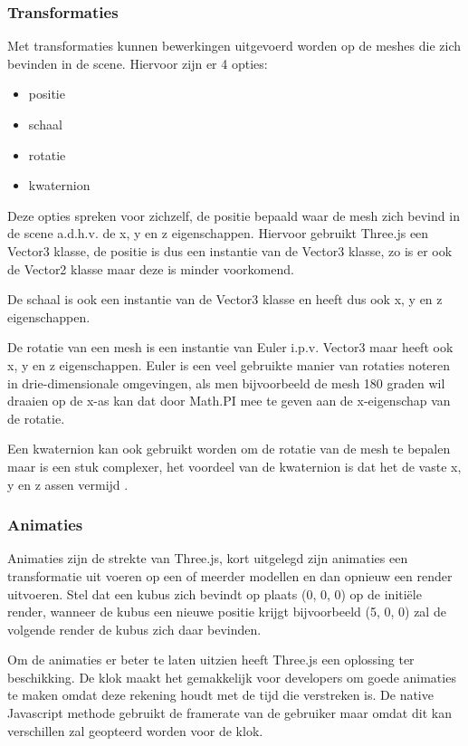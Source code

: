 \subsubsection{Transformaties}

Met transformaties kunnen bewerkingen uitgevoerd worden op de meshes die zich bevinden in de scene. Hiervoor zijn er 4 opties: 

\begin{itemize}
	\item positie
	\item schaal
	\item rotatie
	\item kwaternion
\end{itemize}

Deze opties spreken voor zichzelf, de positie bepaald waar de mesh zich bevind in de scene a.d.h.v. de x, y en z eigenschappen. Hiervoor gebruikt Three.js een Vector3 klasse, de positie is dus een instantie van de Vector3 klasse, zo is er ook de Vector2 klasse maar deze is minder voorkomend.

De schaal is ook een instantie van de Vector3 klasse en heeft dus ook x, y en z eigenschappen.

De rotatie van een mesh is een instantie van Euler i.p.v. Vector3 maar heeft ook x, y en z eigenschappen. Euler is een veel gebruikte manier van rotaties noteren in drie-dimensionale omgevingen, als men bijvoorbeeld de mesh 180 graden wil draaien op de x-as kan dat door Math.PI mee te geven aan de x-eigenschap van de rotatie.

Een kwaternion kan ook gebruikt worden om de rotatie van de mesh te bepalen maar is een stuk complexer, het voordeel van de kwaternion is dat het de vaste x, y en z assen vermijd \autocite{Simon2023}.

\subsubsection{Animaties}

Animaties zijn de strekte van Three.js, kort uitgelegd zijn animaties een transformatie uit voeren op een of meerder modellen en dan opnieuw een render uitvoeren. Stel dat een kubus zich bevindt op plaats (0, 0, 0) op de initiële render, wanneer de kubus een nieuwe positie krijgt bijvoorbeeld (5, 0, 0) zal de volgende render de kubus zich daar bevinden. 

Om de animaties er beter te laten uitzien heeft Three.js een oplossing ter beschikking. De klok maakt het gemakkelijk voor developers om goede animaties te maken omdat deze rekening houdt met de tijd die verstreken is. De native Javascript methode gebruikt de framerate van de gebruiker maar omdat dit kan verschillen zal geopteerd worden voor de klok.

